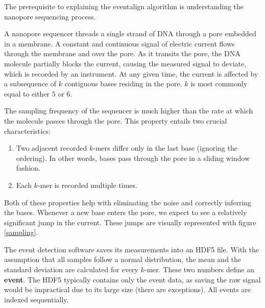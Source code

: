 \documentclass[times, utf, seminar]{fer}
\begin{document}
The prerequisite to explaining the eventalign algorithm is understanding the nanopore sequencing process.

A nanopore sequencer threads a single strand of DNA through a pore embedded in a membrane. A constant and continuous signal of electric current flows through the membrane and over the pore. As it transits the pore, the DNA molecule partially blocks the current, causing the measured signal to deviate, which is recorded by an instrument. At any given time, the current
is affected by a subsequence of $k$ contiguous bases residing in the pore. $k$ is most commonly equal to either $5$ or $6$.

The sampling frequency of the sequencer is much higher than the rate at which the molecule passes through the pore.
This property entails two crucial characteristics:
\begin{enumerate}
	\item Two adjacent recorded $k$-mers differ only in the last base (ignoring the ordering). In other words, bases pass through the pore in a sliding window fashion.
	\item Each $k$-mer is recorded multiple times.
\end{enumerate}
Both of these properties help with eliminating the noise and correctly inferring the bases.
Whenever a new base enters the pore, we expect to see a relatively significant jump in the current. These jumps are visually represented with figure \ref{sampling}.

The event detection software saves its measurements into an HDF5 file. With the assumption that all samples follow a normal distribution, the mean and the standard deviation are calculated for every $k$-mer. These two numbers define an \textbf{event}. The HDF5 typically contains only the event data, as saving the raw signal would be impractical due to its large size (there are exceptions). All events are indexed sequentially.
\end{document}
